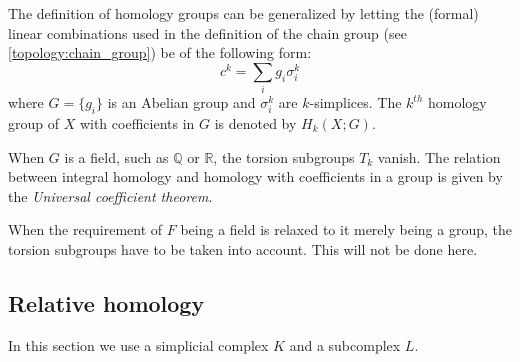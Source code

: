 	\begin{construct}
		The definition of homology groups can be generalized by letting the (formal) linear combinations used in the definition of the chain group (see \ref{topology:chain_group}) be of the following form:
		\begin{equation}
			c^k = \sum_ig_i\sigma_i^k
		\end{equation}
		where $G = \{g_i\}$ is an Abelian group and $\sigma_i^k$ are $k$-simplices. The $k^{th}$ homology group of $X$ with coefficients in $G$ is denoted by $H_k(X; G)$.
	\end{construct}
	\begin{property}
		When $G$ is a field, such as $\mathbb{Q}$ or $\mathbb{R}$, the torsion subgroups $T_k$ vanish. The relation between integral homology and homology with coefficients in a group is given by the \textit{Universal coefficient theorem}.
	\end{property}
	
	\begin{remark*}
		When the requirement of $F$ being a field is relaxed to it merely being a group, the torsion subgroups have to be taken into account. This will not be done here.
	\end{remark*}
	
\subsection{Relative homology}

	In this section we use a simplicial complex $K$ and a subcomplex $L$.
	

